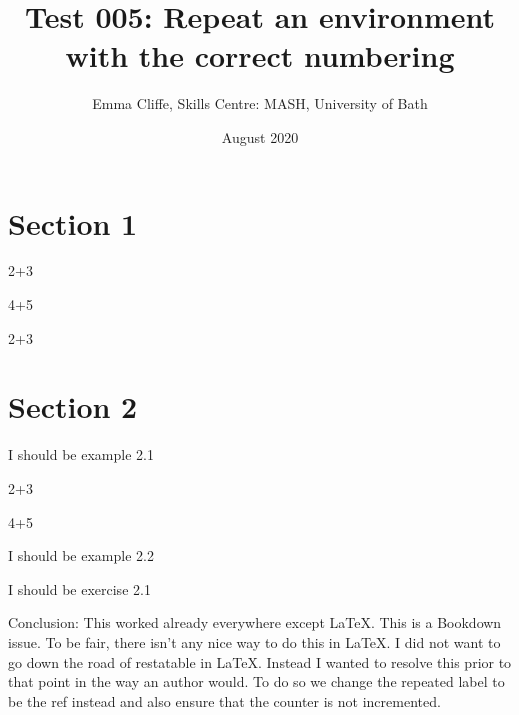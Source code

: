 \documentclass[10pt,english,a4paper]{article}
\title{Test 005: Repeat an environment with the correct numbering}
\author{Emma Cliffe, Skills Centre: MASH, University of Bath}
\date{August 2020}
\theoremstyle{plain}
\theoremstyle{plain}
\theoremstyle{plain}
\theoremstyle{plain}
\theoremstyle{plain}
\theoremstyle{definition}
\theoremstyle{definition}
\theoremstyle{definition}
\theoremstyle{remark}
\theoremstyle{remark}
\let\BeginKnitrBlock\begin \let\EndKnitrBlock\end
\begin{document}
\maketitle

{
\setcounter{tocdepth}{2}
\tableofcontents
}
\hypertarget{section-1}{%
\section{Section 1}\label{section-1}}

\BeginKnitrBlock{example}
\label{exm:inbuilt} 2+3
\EndKnitrBlock{example}

\BeginKnitrBlock{Exercise}
\protect\hypertarget{Exercise:author}{}{\label{Exe:author}}4+5
\EndKnitrBlock{Exercise}
\begingroup\renewcommand{\theexample}{\ref{exm:inbuilt}}
\BeginKnitrBlock{example}
 2+3
\EndKnitrBlock{example}
\endgroup\addtocounter{example}{-1}
\hypertarget{section-2}{%
\section{Section 2}\label{section-2}}

\BeginKnitrBlock{example}
\label{exm:unnamed-chunk-1} I should be example 2.1
\EndKnitrBlock{example}
\begingroup\renewcommand{\theexample}{\ref{exm:inbuilt}}
\BeginKnitrBlock{example}
 2+3
\EndKnitrBlock{example}
\endgroup\addtocounter{example}{-1}\begingroup\renewcommand{\theExercise}{\ref{Exe:author}}
\BeginKnitrBlock{Exercise}
\protect\hypertarget{Exercise:author}{}{}4+5
\EndKnitrBlock{Exercise}
\endgroup\addtocounter{Exercise}{-1}
\BeginKnitrBlock{example}
\label{exm:unnamed-chunk-2} I should be example 2.2
\EndKnitrBlock{example}

\BeginKnitrBlock{Exercise}
\protect\hypertarget{Exercise:author2}{}{\label{Exe:author2}}I should be exercise 2.1
\EndKnitrBlock{Exercise}

Conclusion: This worked already everywhere except LaTeX. This is a Bookdown issue. To be fair, there isn't any nice way to do this in LaTeX. I did not want to go down the road of restatable in LaTeX. Instead I wanted to resolve this prior to that point in the way an author would. To do so we change the repeated label to be the ref instead and also ensure that the counter is not incremented.
\end{document}
